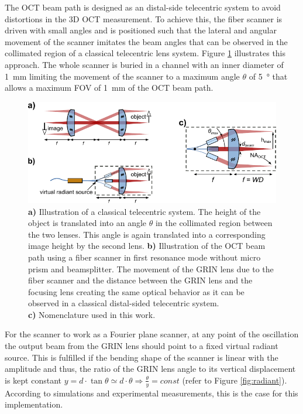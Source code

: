 The OCT beam path is designed as an distal-side telecentric system to avoid distortions in the 3D OCT measurement. To achieve this, the fiber scanner is driven with small angles and is positioned such that the lateral and angular movement of the scanner imitates the beam angles that can be observed in the collimated region of a classical telecentric lens system. Figure \ref{fig:fps} illustrates this approach. The whole scanner is buried in a channel with an inner diameter of \SI{1}{\milli\meter} limiting the movement of the scanner to a maximum angle $\theta$ of \SI{5}{\degree} that allows a maximum FOV of \SI{1}{\milli\meter} of the OCT beam path.


\begin{figure}[h!]\centering \includegraphics[width=\columnwidth]{figures/30_DesignSimulation/fps.pdf}
      \caption{\textbf{a)} Illustration of a classical telecentric system. The height of the object is translated into an angle $\theta$ in the collimated region between the two lenses. This angle is again translated into a corresponding image height by the second lens.
      \textbf{b)} Illustration of the OCT beam path using a fiber scanner in first resonance mode without micro prism and beamsplitter. The movement of the GRIN lens due to the fiber scanner and the distance between the GRIN lens and the focusing lens creating the same optical behavior as it can be observed in a classical distal-sided telecentric system. \\ \textbf{c)} Nomenclature used in this work.}
      \label{fig:fps}
\end{figure}

For the scanner to work as a Fourier plane scanner, at any point of the oscillation the output beam from the GRIN lens should point to a fixed virtual radiant source. This is fulfilled if the bending shape of the scanner is linear with the amplitude and thus, the ratio of the GRIN lens angle to its vertical displacement is kept constant $ y = d \cdot \tan \theta \simeq d \cdot \theta \Rightarrow \frac{\theta}{y} = const $ (refer to Figure \ref{fig:radiant}). According to simulations and experimental measurements, this is the case for this implementation.

